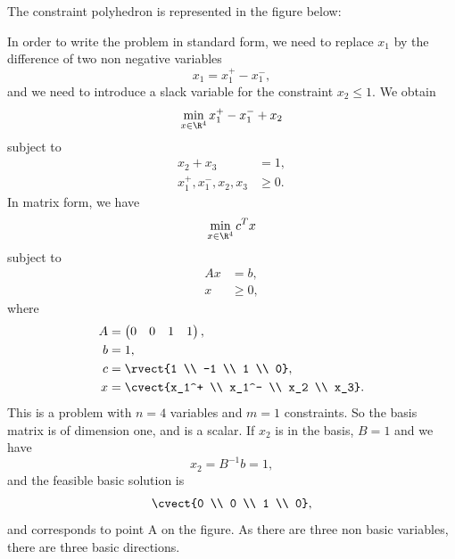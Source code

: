 
\makeatletter
\renewcommand*\env@matrix[1][*\c@MaxMatrixCols c]{%
  \hskip -\arraycolsep
  \let\@ifnextchar\new@ifnextchar
  \array{#1}}
\makeatother

The constraint polyhedron is represented in the figure below:

\begin{center}
\end{center}

In order to write
the problem in standard form, we need to replace $x_1$ by the
difference of two non negative variables
\[
x_1 = x_1^+ - x_1^-,
\]
and we need to introduce a slack variable for the constraint $x_2 \leq 1$.
We obtain
\[
\min_{x \in \R^4} x_1^+ - x_1^-  + x_2
\]
subject to
\begin{align*}
  x_2 + x_3 &= 1, \\
  x_1^+, x_1^-, x_2, x_3 &\geq 0.
\end{align*}
In matrix form, we have
\[
\min_{x \in \R^4} c^T x
\]
subject to
\begin{align*}
  Ax &= b, \\
  x &\geq 0,
\end{align*}
where
\begin{align*}
  A &= \begin{pmatrix}
    0 & 0 & 1 & 1 
  \end{pmatrix}, \\
  b &= 1, \\
  c &= \rvect{1 \\ -1 \\ 1 \\ 0},\\
  x &= \cvect{x_1^+ \\ x_1^- \\ x_2 \\ x_3}.
\end{align*}
This is a problem with $n=4$ variables and $m=1$
constraints. So the basis matrix is of dimension one, and is a scalar.
If $x_2$ is in the basis, $B=1$ and we have
  \[
  x_2=B^{-1}b=1,
  \]
and the feasible basic solution is
  \[
\cvect{0 \\ 0 \\ 1 \\ 0},
\]
and corresponds to point A on the figure. As there are three non basic
variables, there are three basic directions.

